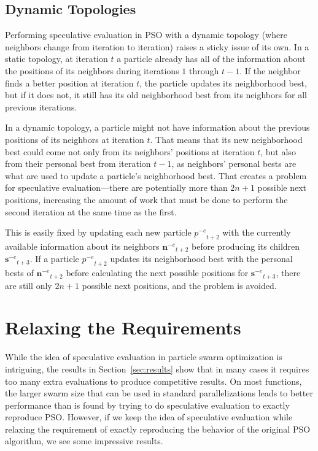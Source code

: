 \documentclass[smallcondensed]{svjour3}
\renewcommand{\sec}[1]{Section~\ref{sec:#1}}
\providecommand{\noeval}[1]{\ensuremath{#1^{-e}}}
\providecommand{\p}{\ensuremath{p}}
\providecommand{\sset}{\ensuremath{\mathbf{s}}}
\providecommand{\nset}{\ensuremath{\mathbf{n}}}
\begin{document}
\subsection{Dynamic Topologies}

Performing speculative evaluation in PSO with a dynamic topology (where
neighbors change from iteration to iteration) raises a sticky issue of its own.
In a static topology, at iteration $t$ a particle already has all of the
information about the positions of its neighbors during iterations $1$ through
$t-1$.  If the neighbor finds a better position at iteration $t$, the particle
updates its neighborhood best, but if it does not, it still has its old
neighborhood best from its neighbors for all previous iterations.

In a dynamic topology, a particle might not have information about the previous
positions of its neighbors at iteration $t$.  That means that its new
neighborhood best could come not only from its neighbors' positions at
iteration $t$, but also from their personal best from iteration $t-1$, as
neighbors' personal bests are what are used to update a particle's neighborhood
best.  That creates a problem for speculative evaluation---there are
potentially more than $2n+1$ possible next positions, increasing the amount of
work that must be done to perform the second iteration at the same time as the
first.

This is easily fixed by updating each new particle $\noeval{\p}_{t+2}$ with the
currently available information about its neighbors $\noeval{\nset}_{t+2}$
before producing its children $\noeval{\sset}_{t+3}$.  If a particle
$\noeval{\p}_{t+2}$ updates its neighborhood best with the personal bests of
$\noeval{\nset}_{t+2}$ before calculating the next possible positions for
$\noeval{\sset}_{t+3}$, there are still only $2n+1$ possible next positions,
and the problem is avoided.

\section{Relaxing the Requirements}
\label{sec:relax}

While the idea of speculative evaluation in particle swarm optimization is
intriguing, the results in \sec{results} show that in many cases it requires
too many extra evaluations to produce competitive results.  On most functions,
the larger swarm size that can be used in standard parallelizations leads to
better performance than is found by trying to do speculative evaluation to
exactly reproduce PSO.  However, if we keep the idea of speculative evaluation
while relaxing the requirement of exactly reproducing the behavior of the
original PSO algorithm, we see some impressive results.
\end{document}
